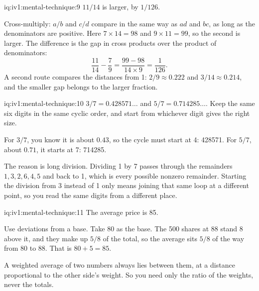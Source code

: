 \begin{solution}{iq:iv1:mental-technique:9}
$11/14$ is larger, by $1/126$.

Cross-multiply: $a/b$ and $c/d$ compare in the same way as $ad$ and $bc$, as long as the denominators are positive. Here $7 \times 14 = 98$ and $9 \times 11 = 99$, so the second is larger. The difference is the gap in cross products over the product of denominators:
\[
\frac{11}{14} - \frac{7}{9} = \frac{99 - 98}{14 \times 9} = \frac{1}{126}.
\]
A second route compares the distances from 1: $2/9 \approx 0.222$ and $3/14 \approx 0.214$, and the smaller gap belongs to the larger fraction.

\end{solution}

\begin{solution}{iq:iv1:mental-technique:10}
$3/7 = 0.428571\dots$ and $5/7 = 0.714285\dots$. Keep the same six digits in the same cyclic order, and start from whichever digit gives the right size.

For $3/7$, you know it is about $0.43$, so the cycle must start at 4: 428571. For $5/7$, about $0.71$, it starts at 7: 714285.

The reason is long division. Dividing 1 by 7 passes through the remainders $1, 3, 2, 6, 4, 5$ and back to 1, which is every possible nonzero remainder. Starting the division from 3 instead of 1 only means joining that same loop at a different point, so you read the same digits from a different place.

\end{solution}

\begin{solution}{iq:iv1:mental-technique:11}
The average price is 85.

Use deviations from a base. Take 80 as the base. The 500 shares at 88 stand 8 above it, and they make up $5/8$ of the total, so the average sits $5/8$ of the way from 80 to 88. That is $80 + 5 = 85$.

A weighted average of two numbers always lies between them, at a distance proportional to the other side's weight. So you need only the ratio of the weights, never the totals.

\end{solution}

